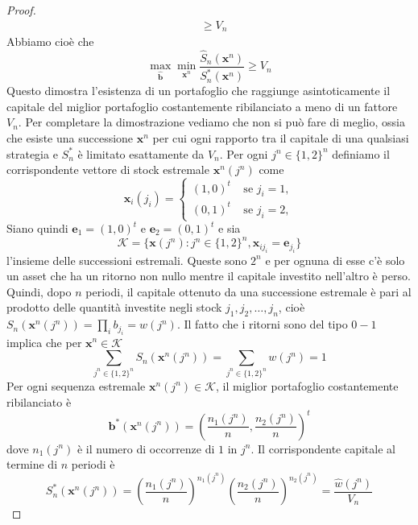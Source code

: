 \documentclass[a4paper,11pt]{book}
\theoremstyle{plain}
\theoremstyle{definition}
\theoremstyle{remark}
\newcommand{\x}{\bm{x}}
\newcommand{\B}{\bm{b}}
\newcommand{\bh}{\hat{\bm{b}}}
\newcommand{\Sh}{\hat{S}}
\begin{document}
\begin{proof}
\begin{equation*}
\begin{split}
		& \geq V_n
		\end{split}
	\end{equation*}
	Abbiamo cioè che
	\begin{equation*}
		\max\limits_{\bh}\min\limits_{\x^n}\frac{\Sh_n(\x^n)}{S_n^*(\x^n)}\geq V_n
	\end{equation*}
	Questo dimostra l'esistenza di un portafoglio che raggiunge asintoticamente il capitale del miglior portafoglio costantemente ribilanciato a meno di un fattore $V_n$. Per completare la dimostrazione vediamo che non si può fare di meglio, ossia che esiste una successione $\x^n$ per cui ogni rapporto tra il capitale di una qualsiasi strategia e $S_n^*$ è limitato esattamente da $V_n$.\newline
	Per ogni $j^n\in\{1,2\}^n$ definiamo il corrispondente vettore di stock estremale $\x^n(j^n)$ come
	\begin{equation*}
		\x_i(j_i) = \begin{cases}
		(1,0)^t\;\;\;\; \text{se } j_i=1, \\
		(0,1)^t\;\;\;\; \text{se } j_i=2,
		\end{cases}
	\end{equation*}
	Siano quindi $\bm{e}_1 = (1,0)^t$ e $\bm{e}_2 = (0,1)^t$ e sia 
	\begin{equation*}
		\mathcal{K} = \{\x(j^n):j^n\in\{1,2\}^n, \x_{ij_i}=\bm{e}_{j_i}\}
	\end{equation*}
	l'insieme delle successioni estremali. Queste sono $2^n$ e per ognuna di esse c'è solo un asset che ha un ritorno non nullo mentre il capitale investito nell'altro è perso. Quindi, dopo $n$ periodi, il capitale ottenuto da una successione estremale è pari al prodotto delle quantità investite negli stock $j_1,j_2,\ldots,j_n$, cioè $S_n(\x^n(j^n))=\prod_{i}{b_{j_i}}=w(j^n)$. Il fatto che i ritorni sono del tipo $0-1$ implica che per $\x^n\in\mathcal{K}$
	\begin{equation*}
		\sum_{j^n\in\{1,2\}^n}{S_n(\x^n(j^n))}=\sum_{j^n\in\{1,2\}^n}w(j^n)=1
	\end{equation*}
	Per ogni sequenza estremale $\x^n(j^n)\in\mathcal{K}$, il miglior portafoglio costantemente ribilanciato è 
	\begin{equation*}
		\B^*(\x^n(j^n))=\left(\frac{n_1(j^n)}{n},\frac{n_2(j^n)}{n}\right)^t
	\end{equation*}
	dove $n_1(j^n)$ è il numero di occorrenze di $1$ in $j^n$. Il corrispondente capitale al termine di $n$ periodi è
	\begin{equation*}
		S_n^*(\x^n(j^n))=\left(\frac{n_1(j^n)}{n}\right)^{n_1(j^n)}\left(\frac{n_2(j^n)}{n}\right)^{n_2(j^n)}=\frac{\hat{w}(j^n)}{V_n}

\end{equation*}
\end{proof}
\end{document}
